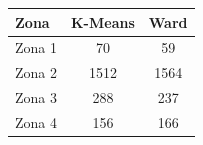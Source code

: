 \begin{tabular}{lcc}
\toprule
Zona & K-Means & Ward \\
\midrule
Zona 1 & 70 & 59 \\
Zona 2 & 1512 & 1564 \\
Zona 3 & 288 & 237 \\
Zona 4 & 156 & 166 \\
\bottomrule
\end{tabular}